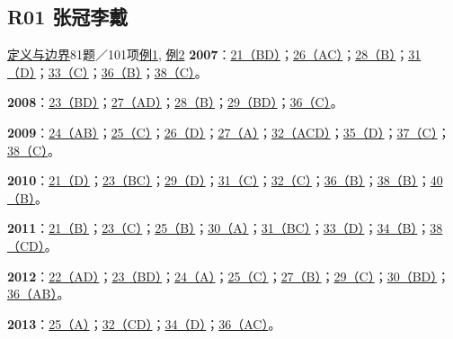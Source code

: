 \documentclass[11pt,a4paper]{article}
\begin{document}
\subsection{R01 张冠李戴}\label{class-R01}
\noindent \hyperref[cat-R01]{定义与边界}\quad 81题／101项\quad \hyperref[case-2007-T2-Q26]{例1}, \hyperref[case-2015-T2-Q28]{例2}
\noindent\textbf{2007}：\hyperref[idx-2007-T1-Q21]{21（BD）}；\hyperref[idx-2007-T2-Q26]{26（AC）}；\hyperref[idx-2007-T2-Q28]{28（B）}；\hyperref[idx-2007-T3-Q31]{31（D）}；\hyperref[idx-2007-T3-Q33]{33（C）}；\hyperref[idx-2007-T4-Q36]{36（B）}；\hyperref[idx-2007-T4-Q38]{38（C）}。\par
\noindent\textbf{2008}：\hyperref[idx-2008-T1-Q23]{23（BD）}；\hyperref[idx-2008-T2-Q27]{27（AD）}；\hyperref[idx-2008-T2-Q28]{28（B）}；\hyperref[idx-2008-T2-Q29]{29（BD）}；\hyperref[idx-2008-T4-Q36]{36（C）}。\par
\noindent\textbf{2009}：\hyperref[idx-2009-T1-Q24]{24（AB）}；\hyperref[idx-2009-T1-Q25]{25（C）}；\hyperref[idx-2009-T2-Q26]{26（D）}；\hyperref[idx-2009-T2-Q27]{27（A）}；\hyperref[idx-2009-T3-Q32]{32（ACD）}；\hyperref[idx-2009-T3-Q35]{35（D）}；\hyperref[idx-2009-T4-Q37]{37（C）}；\hyperref[idx-2009-T4-Q38]{38（C）}。\par
\noindent\textbf{2010}：\hyperref[idx-2010-T1-Q21]{21（D）}；\hyperref[idx-2010-T1-Q23]{23（BC）}；\hyperref[idx-2010-T2-Q29]{29（D）}；\hyperref[idx-2010-T3-Q31]{31（C）}；\hyperref[idx-2010-T3-Q32]{32（C）}；\hyperref[idx-2010-T4-Q36]{36（B）}；\hyperref[idx-2010-T4-Q38]{38（B）}；\hyperref[idx-2010-T4-Q40]{40（B）}。\par
\noindent\textbf{2011}：\hyperref[idx-2011-T1-Q21]{21（B）}；\hyperref[idx-2011-T1-Q23]{23（C）}；\hyperref[idx-2011-T1-Q25]{25（B）}；\hyperref[idx-2011-T2-Q30]{30（A）}；\hyperref[idx-2011-T3-Q31]{31（BC）}；\hyperref[idx-2011-T3-Q33]{33（D）}；\hyperref[idx-2011-T3-Q34]{34（B）}；\hyperref[idx-2011-T4-Q38]{38（CD）}。\par
\noindent\textbf{2012}：\hyperref[idx-2012-T1-Q22]{22（AD）}；\hyperref[idx-2012-T1-Q23]{23（BD）}；\hyperref[idx-2012-T1-Q24]{24（A）}；\hyperref[idx-2012-T1-Q25]{25（C）}；\hyperref[idx-2012-T2-Q27]{27（B）}；\hyperref[idx-2012-T2-Q29]{29（C）}；\hyperref[idx-2012-T2-Q30]{30（BD）}；\hyperref[idx-2012-T4-Q36]{36（AB）}。\par
\noindent\textbf{2013}：\hyperref[idx-2013-T1-Q25]{25（A）}；\hyperref[idx-2013-T3-Q32]{32（CD）}；\hyperref[idx-2013-T3-Q34]{34（D）}；\hyperref[idx-2013-T4-Q36]{36（AC）}。\par
\end{document}
